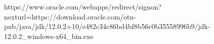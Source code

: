 https://www.oracle.com/webapps/redirect/signon?nexturl=https://download.oracle.com/otn-pub/java/jdk/12.0.2+10/e482c34c86bd4bf8b56c0b35558996b9/jdk-12.0.2_windows-x64_bin.exe